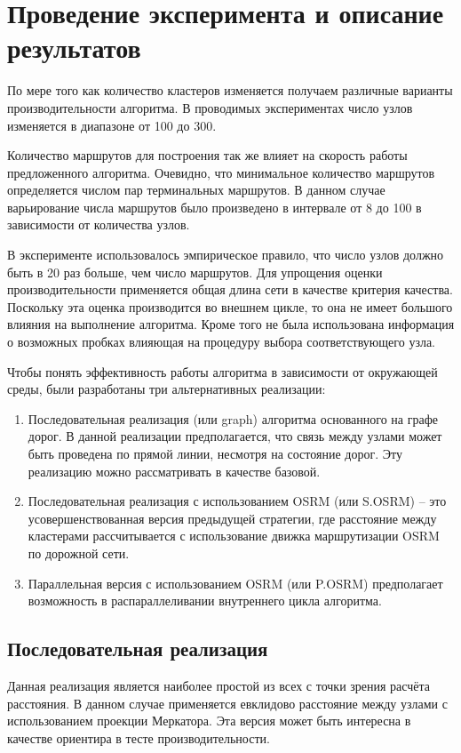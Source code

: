 \section{Проведение эксперимента и описание результатов}
По мере того как количество кластеров изменяется получаем различные варианты производительности алгоритма. 
В проводимых экспериментах число узлов изменяется в диапазоне от 100 до 300.

Количество маршрутов для построения так же влияет на скорость работы предложенного алгоритма. Очевидно, что 
минимальное количество маршрутов определяется числом пар терминальных маршрутов. В данном случае варьирование 
числа маршрутов было произведено в интервале от 8 до 100 в зависимости от количества узлов.

В эксперименте использовалось эмпирическое правило, что число узлов должно быть в 20 раз больше, чем число 
маршрутов. Для упрощения оценки производительности применяется общая длина сети в качестве критерия качества.
Поскольку эта оценка производится во внешнем цикле, то она не имеет большого влияния на выполнение алгоритма.
Кроме того не была использована информация о возможных пробках влияющая на процедуру выбора соответствующего 
узла.

Чтобы понять эффективность работы алгоритма в зависимости от окружающей среды, были разработаны три 
альтернативных реализации:
\begin{enumerate}
    \item Последовательная реализация (или graph) алгоритма основанного на графе дорог. В данной реализации 
        предполагается, что связь между узлами может быть проведена по прямой линии, несмотря на состояние 
        дорог. Эту реализацию можно рассматривать в качестве базовой.
    \item Последовательная реализация с использованием OSRM (или S.OSRM) -- это усовершенствованная версия 
        предыдущей стратегии, где расстояние между кластерами рассчитывается с использование движка 
        маршрутизации OSRM по дорожной сети.
    \item Параллельная версия с использованием OSRM (или P.OSRM) предполагает возможность в распараллеливании 
        внутреннего цикла алгоритма.  
\end{enumerate}

\clearpage

\subsection{Последовательная реализация}
Данная реализация является наиболее простой из всех с точки зрения расчёта расстояния. В данном случае 
применяется евклидово расстояние между узлами с использованием проекции Меркатора. Эта версия может быть 
интересна в качестве ориентира в тесте производительности.

